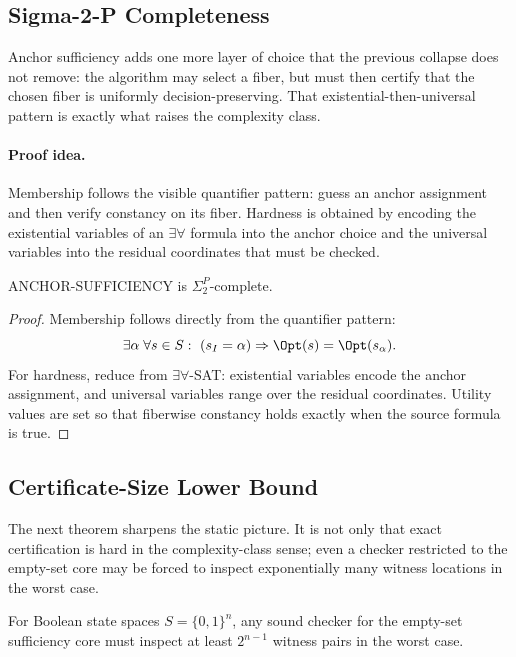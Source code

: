 \subsection{Sigma-2-P Completeness}

Anchor sufficiency adds one more layer of choice that the previous collapse does not remove: the algorithm may select a fiber, but must then certify that the chosen fiber is uniformly decision-preserving. That existential-then-universal pattern is exactly what raises the complexity class.

\paragraph{Proof idea.}
Membership follows the visible quantifier pattern: guess an anchor assignment and then verify constancy on its fiber. Hardness is obtained by encoding the existential variables of an $\exists\forall$ formula into the anchor choice and the universal variables into the residual coordinates that must be checked.

\begin{theorem}\label{thm:anchor-sigma2p}
ANCHOR-SUFFICIENCY is $\Sigma_2^P$-complete.
\end{theorem}


\begin{proof}
Membership follows directly from the quantifier pattern:
\[
\exists\alpha\;\forall s\in S:\ (s_I=\alpha)\Rightarrow \Opt(s)=\Opt(s_\alpha).
\]
For hardness, reduce from $\exists\forall$-SAT: existential variables encode the anchor assignment, and universal variables range over the residual coordinates. Utility values are set so that fiberwise constancy holds exactly when the source formula is true.
\end{proof}

\subsection{Certificate-Size Lower Bound}

The next theorem sharpens the static picture. It is not only that exact certification is hard in the complexity-class sense; even a checker restricted to the empty-set core may be forced to inspect exponentially many witness locations in the worst case.

\begin{theorem}\label{thm:witness-checking-duality}
For Boolean state spaces $S=\{0,1\}^n$, any sound checker for the empty-set sufficiency core must inspect at least $2^{n-1}$ witness pairs in the worst case.
\end{theorem}

